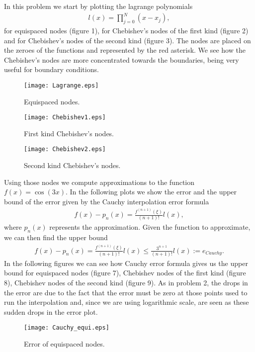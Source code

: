 In this problem we start by plotting the lagrange polynomials
\begin{align*}
l(x)=\prod_{j=0}^N(x-x_j),
\end{align*}
for equispaced nodes (figure 1), for Chebishev's nodes of the first kind (figure 2) and for Chebishev's nodes of the second kind (figure 3). The nodes are placed on the zeroes of the functions and represented by the red asterisk. We see how the Chebishev's nodes are more concentrated towards the boundaries, being very useful for boundary conditions.

\begin{figure}[H]
\centering     %
{\texttt{[image: Lagrange.eps]}}
\caption{Equispaced nodes.}
\end{figure}

\begin{figure}[H]
\centering     %
{\texttt{[image: Chebishev1.eps]}}
\caption{First kind Chebishev's nodes.}
\end{figure}

\begin{figure}[H]
\centering     %
{\texttt{[image: Chebishev2.eps]}}
\caption{Second kind Chebishev's nodes.}
\end{figure}

Using those nodes we compute approximations to the function $f(x)=\cos(3x)$. In the following plots we show the error and the upper bound of the error given by the Cauchy interpolation error formula
\begin{align*}
f(x)-p_n(x)=\frac{f^{(n+1)}(\xi)}{(n+1)!}l(x),
\end{align*}
where $p_n(x)$ represents the approximation. Given the function to approximate, we can then find the upper bound
\begin{align*}
f(x)-p_n(x)=\frac{f^{(n+1)}(\xi)}{(n+1)!}l(x)\leq\frac{3^{n+1}}{(n+1)!}l(x):=e_{Cauchy}.
\end{align*}
In the following figures we can see how Cauchy error formula gives us the upper bound for equispaced nodes (figure 7), Chebishev nodes of the first kind (figure 8), Chebishev nodes of the second kind (figure 9). As in problem 2, the drops in the error are due to the fact that the error must be zero at those points used to run the interpolation and, since we are using logarithmic scale, are seen as these sudden drops in the error plot. 
\begin{figure}[H]
\centering     %
{\texttt{[image: Cauchy\_equi.eps]}}
\caption{Error of equispaced nodes.}
\end{figure}

